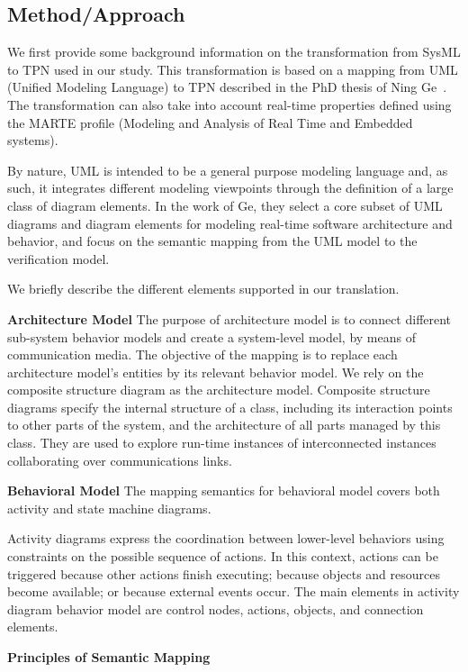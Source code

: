 \subsection{Method/Approach}

We first provide some background information on the transformation from
SysML to TPN used in our study. This transformation
is based on a mapping from UML (Unified Modeling Language) to TPN
described in the PhD thesis of Ning Ge~\cite{Ge2014}. The
transformation can also take into account real-time properties defined
using the MARTE profile (Modeling and Analysis of Real Time and
Embedded systems). 

By nature, UML is intended to be a general purpose modeling language
and, as such, it integrates different modeling viewpoints through the
definition of a large class of diagram elements. In the work of Ge, they
select a core subset of UML diagrams and diagram elements for
modeling real-time software architecture and behavior, and focus on
the semantic mapping from the UML model to the verification model.

We briefly describe the different elements supported in our
translation.

\textbf{Architecture Model}
The purpose of architecture model is to connect different sub-system
behavior models and create a system-level model, by means of
communication media. The objective of the mapping is to replace each
architecture model's entities by its relevant behavior model.  We rely
on the composite structure diagram as the architecture model.
Composite structure diagrams specify the internal structure of a
class, including its interaction points to other parts of the system,
and the architecture of all parts managed by this class. They are used
to explore run-time instances of interconnected instances
collaborating over communications links.

\textbf{Behavioral Model}
The mapping semantics for behavioral model covers both activity and
state machine diagrams.

Activity diagrams express the coordination between lower-level
behaviors using constraints on the possible sequence of actions. In
this context, actions can be triggered because other actions finish
executing; because objects and resources become available; or because
external events occur. The main elements in \uml activity diagram
behavior model are control nodes, actions, objects, and connection
elements.


\textbf{Principles of Semantic Mapping}


